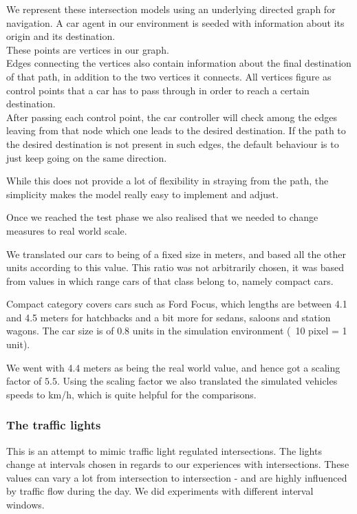 
We represent these intersection models using an underlying directed graph for navigation.
 A car agent in our environment is seeded with information about its origin and its destination.\\
These points are vertices in our graph.\\
Edges connecting the vertices also contain information about the final destination of that path, in addition to the two vertices it connects.
All vertices figure as control points that a car has to pass through in order to reach a certain destination. \\
After passing each control point, the car controller will check among the edges leaving from that node which one leads to the desired destination.
If the path to the desired destination is not present in such edges, the default behaviour is to just keep going on the same direction.

While this does not provide a lot of flexibility in straying from the path, the simplicity makes the model really easy to implement and adjust.


Once we reached the test phase we also realised that we needed to change measures to real world scale.

We translated our cars to being of a fixed size in meters, and based all the other units according to this value. 
This ratio was not arbitrarily chosen, it was based from values in which range cars of that class belong to, namely compact cars.

Compact category covers cars such as Ford Focus, which lengths are between 4.1 and 4.5 meters for hatchbacks and a bit more for sedans, saloons and station wagons.
The car size is of 0.8 units in the simulation environment (~10 pixel = 1 unit).

We went with 4.4 meters as being the real world value, and hence got a scaling factor of $5.5$.
Using the scaling factor we also translated the simulated vehicles speeds to km/h, which is quite helpful for the comparisons.

\subsubsection*{The traffic lights}
This is an attempt to mimic traffic light regulated intersections.
The lights change at intervals chosen in regards to our experiences with intersections. 
These values can vary a lot from intersection to intersection - and are highly influenced by traffic flow during the day. 
We did experiments with different interval windows.

